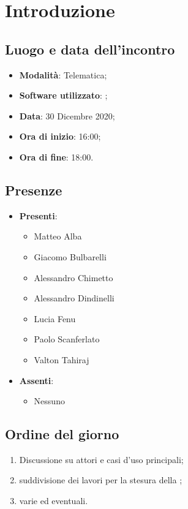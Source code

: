 \documentclass[]{article}
\begin{document}
	

	\newpage

	\section{Introduzione}
		\subsection{Luogo e data dell'incontro}
		\begin{itemize}
			\item \textbf{Modalità}: Telematica;
			\item \textbf{Software utilizzato}: ;
			\item \textbf{Data}: 30 Dicembre 2020;
			\item \textbf{Ora di inizio}: 16:00;
			\item \textbf{Ora di fine}: 18:00.
		\end{itemize}

		\subsection{Presenze}
		\begin{itemize}
			\item \textbf{Presenti}:
		\begin{itemize}
			\item Matteo Alba
			\item Giacomo Bulbarelli
			\item Alessandro Chimetto
			\item Alessandro Dindinelli
			\item Lucia Fenu
			\item Paolo Scanferlato
			\item Valton Tahiraj
		\end{itemize}
			\item \textbf{Assenti}:
			\begin{itemize}
				\item Nessuno
			\end{itemize}
		\end{itemize}

		\subsection{Ordine del giorno}
		\begin{enumerate}
			\item Discussione su attori e casi d'uso principali;
            \item suddivisione dei lavori per la stesura della ;
            \item varie ed eventuali.
		\end{enumerate}
\end{document}
